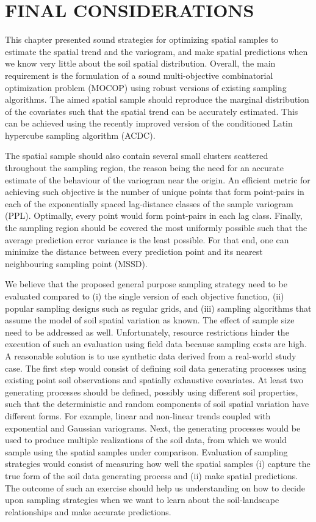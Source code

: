 \section{FINAL CONSIDERATIONS}

This chapter presented sound strategies for optimizing spatial samples to estimate the spatial trend and the 
variogram, and make spatial predictions when we know very little about the soil spatial distribution. Overall, 
the main requirement is the formulation of a sound multi-objective combinatorial optimization problem (MOCOP) 
using robust versions of existing sampling algorithms. The aimed spatial sample should reproduce the marginal 
distribution of the covariates such that the spatial trend can be accurately estimated. This can be achieved 
using the recently improved version of the conditioned Latin hypercube sampling algorithm (ACDC).

The spatial sample should also contain several small clusters scattered throughout the sampling region, the 
reason being the need for an accurate estimate of the behaviour of the variogram near the origin. An efficient 
metric for achieving such objective is the number of unique points that form point-pairs in each of the 
exponentially spaced lag-distance classes of the sample variogram (PPL). Optimally, every point would form 
point-pairs in each lag class. Finally, the sampling region should be covered the most uniformly possible such 
that the average prediction error variance is the least possible. For that end, one can minimize the distance 
between every prediction point and its nearest neighbouring sampling point (MSSD).

We believe that the proposed general purpose sampling strategy need to be evaluated compared to (i) the single 
version of each objective function, (ii) popular sampling designs such as regular grids, and (iii) sampling 
algorithms that assume the model of soil spatial variation as known. The effect of sample size need to be 
addressed as well. Unfortunately, resource restrictions hinder the execution of such an evaluation using field 
data because sampling costs are high. A reasonable solution is to use synthetic data derived from a real-world 
study case. The first step would consist of defining soil data generating processes using existing point soil 
observations and spatially exhaustive covariates. At least two generating processes should be defined, possibly 
using different soil properties, such that the deterministic and random components of soil spatial variation 
have different forms. For example, linear and non-linear trends coupled with exponential and Gaussian 
variograms. Next, the generating processes would be used to produce multiple realizations of the soil data, 
from which we would sample using the spatial samples under comparison. Evaluation of sampling strategies would 
consist of measuring how well the spatial samples (i) capture the true form of the soil data generating 
process and (ii) make spatial predictions. The outcome of such an exercise should help us understanding on how 
to decide upon sampling strategies when we want to learn about the soil-landscape relationships and make 
accurate predictions.

